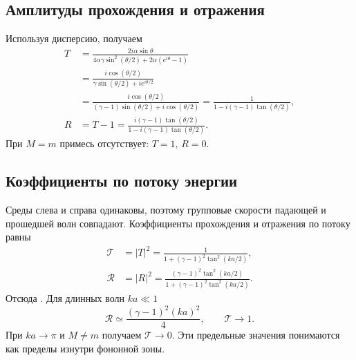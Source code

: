 \documentclass[../final.tex]{subfiles}
\begin{document}
\subsection*{Амплитуды прохождения и отражения}

Используя дисперсию, получаем
\begin{align*}
    T&=\frac{2i\alpha\sin\theta}
             {4\alpha\gamma\sin^2(\theta/2)
                  +2\alpha(e^{i\theta}-1)}\\
     &=\frac{i\cos(\theta/2)}
             {\gamma\sin(\theta/2)+i e^{i\theta/2}}\\
     &=\frac{i\cos(\theta/2)}
             {(\gamma-1)\sin(\theta/2)+i\cos(\theta/2)}
       =\frac1{1-i(\gamma-1)\tan(\theta/2)},\\
    R&=T-1
       =\frac{i(\gamma-1)\tan(\theta/2)}
             {1-i(\gamma-1)\tan(\theta/2)}.
\end{align*}
При $M=m$ примесь отсутствует: $T=1$, $R=0$.

\subsection*{Коэффициенты по потоку энергии}

Среды слева и справа одинаковы, поэтому групповые скорости
падающей и прошедшей волн совпадают. Коэффициенты прохождения
и отражения по потоку равны
\begin{align*}
    \mathcal T&=|T|^2
       =\frac1{1+(\gamma-1)^2\tan^2(ka/2)},\\
    \mathcal R&=|R|^2
       =\frac{(\gamma-1)^2\tan^2(ka/2)}
             {1+(\gamma-1)^2\tan^2(ka/2)}.
\end{align*}
Отсюда .
Для длинных волн $ka\ll1$
\[
    \mathcal R\simeq\frac{(\gamma-1)^2(ka)^2}{4},\qquad
    \mathcal T\longrightarrow1.
\]
При $ka\to\pi$ и $M\ne m$ получаем $\mathcal T\to0$.
Эти предельные значения понимаются как пределы изнутри фононной зоны.
\end{document}
